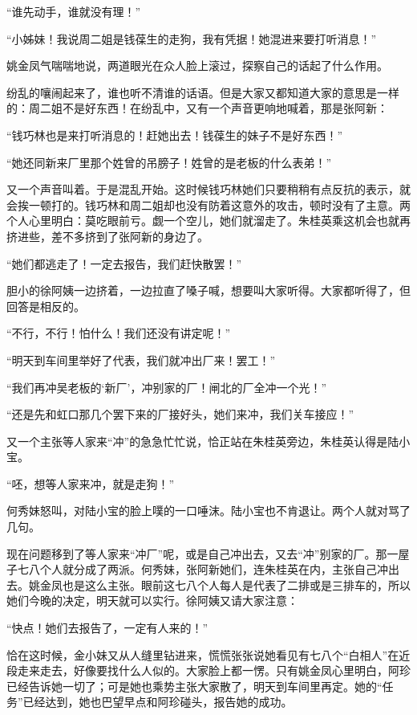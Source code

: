 \par “谁先动手，谁就没有理！”
\par “小姊妹！我说周二姐是钱葆生的走狗，我有凭据！她混进来要打听消息！”
\par 姚金凤气喘喘地说，两道眼光在众人脸上滚过，探察自己的话起了什么作用。
\par 纷乱的嚷闹起来了，谁也听不清谁的话语。但是大家又都知道大家的意思是一样的：周二姐不是好东西！在纷乱中，又有一个声音更响地喊着，那是张阿新：
\par “钱巧林也是来打听消息的！赶她出去！钱葆生的妹子不是好东西！”
\par “她还同新来厂里那个姓曾的吊膀子！姓曾的是老板的什么表弟！”
\par 又一个声音叫着。于是混乱开始。这时候钱巧林她们只要稍稍有点反抗的表示，就会挨一顿打的。钱巧林和周二姐却也没有防着这意外的攻击，顿时没有了主意。两个人心里明白：莫吃眼前亏。觑一个空儿，她们就溜走了。朱桂英乘这机会也就再挤进些，差不多挤到了张阿新的身边了。
\par “她们都逃走了！一定去报告，我们赶快散罢！”
\par 胆小的徐阿姨一边挤着，一边拉直了嗓子喊，想要叫大家听得。大家都听得了，但回答是相反的。
\par “不行，不行！怕什么！我们还没有讲定呢！”
\par “明天到车间里举好了代表，我们就冲出厂来！罢工！”
\par “我们再冲吴老板的‘新厂’，冲别家的厂！闸北的厂全冲一个光！”
\par “还是先和虹口那几个罢下来的厂接好头，她们来冲，我们关车接应！”
\par 又一个主张等人家来“冲”的急急忙忙说，恰正站在朱桂英旁边，朱桂英认得是陆小宝。
\par “呸，想等人家来冲，就是走狗！”
\par 何秀妹怒叫，对陆小宝的脸上噗的一口唾沫。陆小宝也不肯退让。两个人就对骂了几句。
\par 现在问题移到了等人家来“冲厂”呢，或是自己冲出去，又去“冲”别家的厂。那一屋子七八个人就分成了两派。何秀妹，张阿新她们，连朱桂英在内，主张自己冲出去。姚金凤也是这么主张。眼前这七八个人每人是代表了二排或是三排车的，所以她们今晚的决定，明天就可以实行。徐阿姨又请大家注意：
\par “快点！她们去报告了，一定有人来的！”
\par 恰在这时候，金小妹又从人缝里钻进来，慌慌张张说她看见有七八个“白相人”在近段走来走去，好像要找什么人似的。大家脸上都一愣。只有姚金凤心里明白，阿珍已经告诉她一切了；可是她也乘势主张大家散了，明天到车间里再定。她的“任务”已经达到，她也巴望早点和阿珍碰头，报告她的成功。
